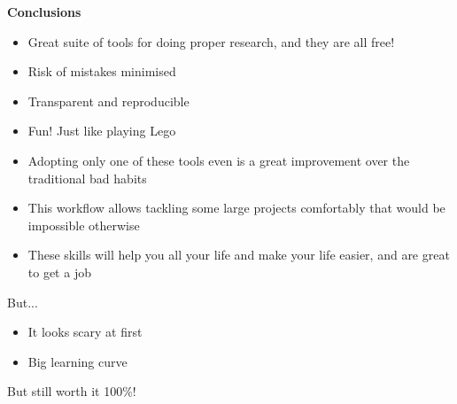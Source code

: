 \documentclass[9pt,xcolor=pdftex,dvipsnames,table]{beamer}
\begin{document}
\begin{frame}{\textbf{Conclusions}}
\begin{itemize}
\item Great suite of tools for doing proper research, and they are all free!
\item Risk of mistakes minimised
\item Transparent and reproducible
\item Fun! Just like playing Lego
\item Adopting only one of these tools even is a great improvement
  over the traditional bad habits
\item This workflow allows tackling some large projects comfortably
  that would be impossible otherwise
\item These skills will help you all your life and make your life
  easier, and are great to get a job
\end{itemize}
But...
\begin{itemize}
\item It looks scary at first
\item Big learning curve
\end{itemize}
But still worth it 100\%!
\end{frame}


\end{document}
